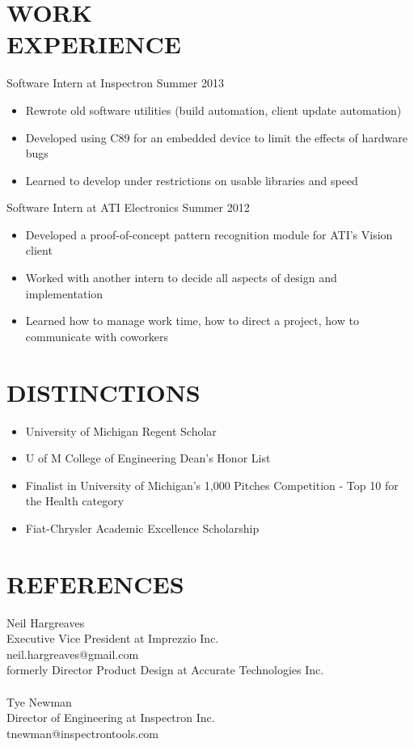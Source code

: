 \documentclass[line,margin]{res}
\begin{document}
\begin{resume}
\section{WORK \\ EXPERIENCE} {\sc Software Intern at Inspectron} \hfill Summer 2013
                 \begin{itemize}  \itemsep -2pt %
                 \item Rewrote old software utilities (build automation, client update automation)
                 \item Developed using C89 for an embedded device to limit the effects of hardware bugs
                 \item Learned to develop under restrictions on usable libraries and speed
                 \end{itemize}
 
                {\sc Software Intern at ATI Electronics} \hfill            Summer 2012
                 \begin{itemize}  \itemsep -2pt %
                 \item Developed a proof-of-concept pattern recognition module for ATI’s Vision client
                 \item Worked with another intern to decide all aspects of design and implementation
                 \item Learned how to manage work time, how to direct a project, how to communicate with coworkers
                 \end{itemize} 

\section{DISTINCTIONS}
    \begin{itemize} \itemsep-0.2em
    \item University of Michigan Regent Scholar
    \item U of M College of Engineering Dean’s Honor List
    \item Finalist in University of Michigan’s 1,000 Pitches Competition - Top 10 for the Health category
    \item Fiat-Chrysler Academic Excellence Scholarship
    \end{itemize}
 
\section{REFERENCES}
    Neil Hargreaves\\
    Executive Vice President at Imprezzio Inc.\\
    neil.hargreaves@gmail.com\\
    formerly Director Product Design at Accurate Technologies Inc.\\
\\
    Tye Newman\\
    Director of Engineering at Inspectron Inc.\\
    tnewman@inspectrontools.com\\
 

\end{resume}
\end{document}
